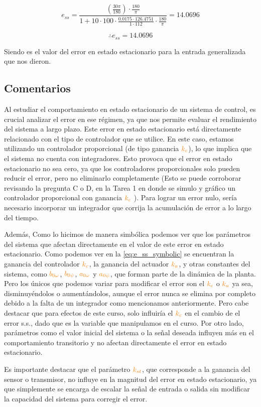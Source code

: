 \begin{equation}
  e_{ss} = \frac{\left(\frac{30 \pi}{180}\right) \cdot \frac{180}{\pi}}{1 + 10 \cdot 100 \cdot \frac{0.0175 \cdot 126.4751}{1 \cdot 112} \cdot \frac{180}{\pi}} = 14.0696
\end{equation}

\[
\boxed{\therefore e_{ss} = 14.0696}
\]

Siendo es el valor del error en estado estacionario para la entrada generalizada que nos dieron.


\FloatBarrier
\subsection{Comentarios}

Al estudiar el comportamiento en estado estacionario de un sistema de control, es crucial analizar el error en ese régimen, ya que nos permite evaluar el rendimiento del sistema a largo plazo. Este error en estado estacionario está directamente relacionado con el tipo de controlador que se utilice. En este caso, estamos utilizando un controlador proporcional (de tipo ganancia \(\nara{k_c}\)), lo que implica que el sistema no cuenta con integradores. Esto provoca que el error en estado estacionario no sea cero, ya que los controladores proporcionales solo pueden reducir el error, pero no eliminarlo completamente (Esto se puede corroborar revisando la pregunta C o D, en la Tarea 1 en donde se simulo y gráfico un controlador proporcional con ganancia \(\nara{k_c} \) ). Para lograr un error nulo, sería necesario incorporar un integrador que corrija la acumulación de error a lo largo del tiempo.

Además, Como lo hicimos de manera simbólica podemos ver que los parámetros del sistema que afectan directamente en el valor de este error en estado estacionario. Como podemos ver en la \eqref{eq:e_ss_symbolic} se encuentran la ganancia del controlador \(\nara{k_c}\), la ganancia del actuador \(\nara{k_a}\), y otras constantes del sistema, como \(\nara{b_{0\omega}}\), \(\nara{b_{0\psi}}\), \(\nara{a_{0\omega}}\) y \(\nara{a_{0\psi}}\), que forman parte de la dinámica de la planta. Pero los únicos que podemos variar para modificar el error son el \(\nara{k_c}\) o \(\nara{k_a}\) ya sea, disminuyéndolos o aumentándolos, aunque el error nunca se elimina por completo debido a la falta de un integrador como mencionamos anteriormente. Pero cabe destacar que para efectos de este curso, solo influiría el \(\nara{k_c}\) en el cambio de el error s.s., dado que es la variable que manipulamos en el curso. Por otro lado, parámetros como el valor inicial del sistema o la señal deseada influyen más en el comportamiento transitorio y no afectan directamente el error en estado estacionario.

Es importante destacar que el parámetro \(\nara{k_{st}}\), que corresponde a la ganancia del sensor o transmisor, no influye en la magnitud del error en estado estacionario, ya que simplemente se encarga de escalar la señal de entrada o salida sin modificar la capacidad del sistema para corregir el error.

